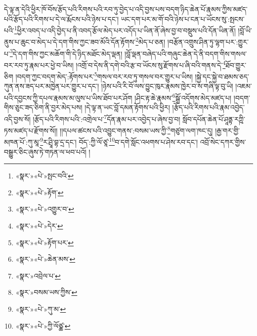 དེ་ལྟ་ན་དེའི་ཕྱིར་ཁོ་བོས་རྩོད་པའི་རིགས་པའི་རབ་ཏུ་བྱེད་པ་འདི་བྱས་པས་བདག་ཉིད་ཆེན་པོ་རྣམས་ཀྱིས་མཛད་པའི་རྩོད་པའི་རིགས་པ་དེ་ལ་རྨོངས་པའི་ཉེས་པ་དང་། ཡང་དག་པར་མ་གོ་བའི་ཉེས་པ་ངན་པ་ཡོངས་སུ་:སྤངས་པའི་\footnote{«སྣར་»«པེ་»སྤང་བའི་}ཕྱིར་འབད་པ་འདི་བྱེད་པ་ནི་འབད་རྩོལ་མེད་པར་འདོད་པ་ཡིན་ནོ་ཞེས་བྱ་བ་བསྡུས་པའི་དོན་ཡིན་ནོ། །བློ་ཡི་ནུས་པ་ཆུང་བ་མེད་པ་དེ་དག་གིས་ཀྱང་ཟབ་མོའི་དོན་རྟོགས་\footnote{«སྣར་»«པེ་»རྟོག་}མེད་པ་ཅན། །བརྩོན་འགྲུས་ཤིན་ཏུ་ལྷག་པར་:གྱུར་པ་\footnote{«སྣར་»«པེ་»འགྱུར་བ་}དེ་དག་གིས་ཀྱང་མཆོག་གི་དེ་ཉིད་མཐོང་མེད་ལྡན། །བློ་ལྡན་བཞེད་པའི་གཞུང་ཆེན་དེ་ནི་བདག་གིས་གསལ་བར་རབ་ཏུ་རྣམ་པར་ཕྱེ་བ་ཡིས། །འགྲོ་བ་དེས་ནི་དགེ་བའི་རྩ་བ་ཡོངས་སུ་རྫོགས་པ་ཞི་བའི་གནས་དེ་\footnote{«སྣར་»«པེ་»དེར་}ཐོབ་གྱུར་ཅིག །བདག་ཀྱང་བདག་མེད་:རྟོགས་པར་\footnote{«སྣར་»«པེ་»རྟོག་པར་}གསལ་བར་རབ་ཏུ་གསལ་བར་གྱུར་པ་ཡིས། །སྐྱེ་དང་སྐྱེ་བ་ཐམས་ཅད་ཀུན་ནས་ཟད་པར་མཁྱེན་པར་གྱུར་པ་དང་། །ཉེས་པའི་རི་བོ་ལས་བྱུང་ཁུར་རྣམས་ཁྱེར་བ་ས་གཞི་ལྟ་བུ་ཡི། །འཇམ་པའི་དབྱངས་ཀྱི་དཔལ་རྣམས་མ་ལུས་པ་ཡིས་ཐོབ་པར་ཤོག །ཤིང་རྟ་ཆེ་རྣམས་\footnote{«སྣར་»«པེ་»ཆེན་མས་}སྒྲོ་འདོགས་མེད་མཛད་པ། །བདག་གིས་ཅུང་ཟད་ཅིག་ནི་བྱར་མེད་པས། །དེ་ལྟ་ན་ཡང་བློ་དམན་རྟོགས་པའི་ཕྱིར། །རྩོད་པའི་རིགས་པའི་རྣམ་འབྱེད་འདི་བྱས་སོ། །རྩོད་པའི་རིགས་པའི་:འགྲེལ་པ་\footnote{«སྣར་»འབྲེལ་པ་}དོན་རྣམ་པར་འབྱེད་པ་ཞེས་བྱ་བ། སློབ་དཔོན་ཆེན་པོ་ཤཱནྟ་རཀྵི་ཏས་མཛད་པ་རྫོགས་སོ།། །།དཔལ་ཚངས་པའི་འབྱུང་གནས་:བསམ་ཡས་ཀྱི་\footnote{«སྣར་»བསམ་ཡས་ཀྱིས་}གཙུག་ལག་ཁང་དུ། །རྒྱ་གར་གྱི་མཁན་པོ་:ཀུ་མཱ་\footnote{«སྣར་»«པེ་»ཀུ་མ་}ར་ཤྲཱི་བྷ་དྲ་དང་། བོད་:ཀྱི་ལོ་ཙཱ་\footnote{«སྣར་»«པེ་»ཀྱི་ལོཙྪ་}བ་དགེ་སློང་འཕགས་པ་ཤེས་རབ་དང་། འབྲོ་སེང་དཀར་གྱིས་བསྒྱུར་ཅིང་ཞུས་ཏེ་གཏན་ལ་ཕབ་པའོ། ། 